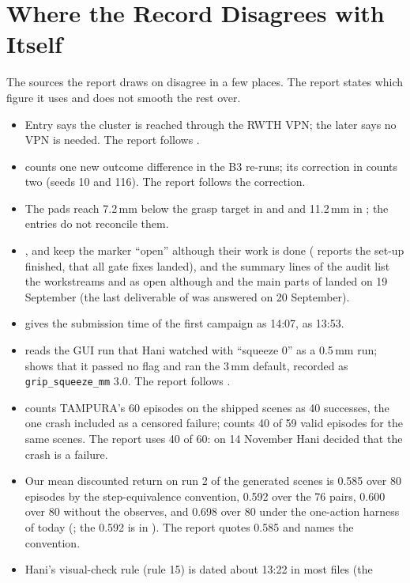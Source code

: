 \section{Where the Record Disagrees with Itself}
\label{sec:disagreements}

The sources the report draws on disagree in a few places. The report states which
figure it uses and does not smooth the rest over.
\begin{itemize}
  \item Entry  says the cluster is reached through the RWTH VPN; the later 
  says no VPN is needed. The report follows .
  \item {} counts one new outcome difference in the B3 re-runs; its correction
  in  counts two (seeds 10 and 116). The report follows the correction.
  \item The pads reach 7.2\,mm below the grasp target in  and  and
  11.2\,mm in ; the entries do not reconcile them.
  \item {},  and  keep the marker ``open'' although their work is done
  ( reports the set-up finished,  that all gate fixes landed), and the
  summary lines of the audit list the workstreams  and  as open although
   and the main parts of  landed on 19 September (the last deliverable of
   was answered on 20 September).
  \item {} gives the submission time of the first campaign as 14:07,  as
  13:53.
  \item {} reads the GUI run that Hani watched with ``squeeze 0'' as a 0.5\,mm run;
   shows that it passed no flag and ran the 3\,mm default, recorded as
  \texttt{grip\_squeeze\_mm} 3.0. The report follows .
  \item {} counts TAMPURA's 60 episodes on the shipped scenes as 40 successes, the
  one crash included as a censored failure;  counts 40 of 59 valid episodes for
  the same scenes. The report uses 40 of 60: on 14 November Hani decided that the crash
  is a failure.
  \item Our mean discounted return on run 2 of the generated scenes is 0.585 over 80
  episodes by the step-equivalence convention, 0.592 over the 76 pairs, 0.600 over 80
  without the observes, and 0.698 over 80 under the one-action harness of today
  (; the 0.592 is in ).
  The report quotes 0.585 and names the convention.
  \item Hani's visual-check rule (rule 15) is dated about 13:22 in most files (the

\end{itemize}
